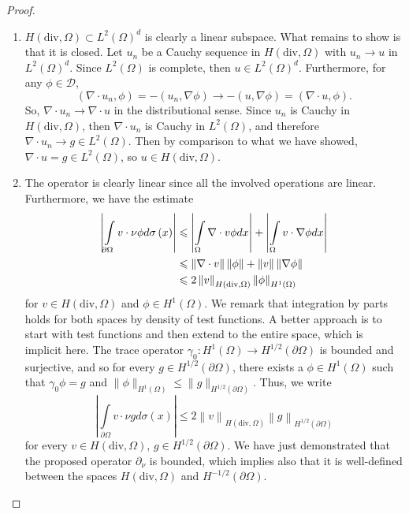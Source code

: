 \documentclass[letterpaper,twoside,11pt]{article}
\theoremstyle{mystyle}
\newcommand{\cblu}{\color{blue}}
\newcommand{\Hone}{H^1\left( \Omega \right)}
\newcommand{\Hdiv}{H\left( \text{div}, \Omega \right)}
\newcommand{\Ltwo}{L^2 \left( \Omega \right)}
\begin{document}
\cblu
\begin{proof}
  \begin{enumerate}
    \item $\Hdiv \subset \Ltwo^d$ is clearly a linear subspace. What remains to show is that it is closed. Let $u_n$ be a Cauchy sequence in $\Hdiv$ with $u_n \to u$ in $\Ltwo^d$. 
    Since $\Ltwo$ is complete, then $u \in \Ltwo^d$. Furthermore, for any \(\phi \in \mathcal D\),
    \[\left( \nabla \cdot u_n, \phi \right) = - \left( u_n, \nabla \phi \right) \to -\left( u, \nabla \phi  \right) = \left( \nabla \cdot u, \phi \right).\]
    So, $\nabla \cdot u_n \to \nabla \cdot u$ in the distributional sense. Since $u_n$ is Cauchy in $\Hdiv$, then $\nabla \cdot u_n$ is Cauchy in $\Ltwo$, and therefore $\nabla \cdot u_n \to g \in \Ltwo$. Then by comparison to what we have showed, $\nabla \cdot u = g \in \Ltwo$, so $u \in \Hdiv$. 
    \item The operator is clearly linear since all the involved operations are linear. Furthermore, we have the estimate 
    \begin{align*}
        \left| {\int\limits_{\partial \Omega } {v \cdot \nu \phi d\sigma \left( x \right)} } \right| &\leqslant \left| {\int\limits_\Omega  {\nabla  \cdot v\phi dx} } \right| + \left| {\int\limits_\Omega  {v \cdot \nabla \phi dx} } \right| \hfill \\
         &\leqslant \left\| {\nabla  \cdot v} \right\|\left\| \phi  \right\| + \left\| v \right\|\left\| {\nabla \phi } \right\| \hfill \\
         &\leqslant 2\left\| v \right\|_{\Hdiv}\left\| \phi  \right\|_{\Hone}
    \end{align*}
    for $v\in \Hdiv$ and $\phi\in \Hone$. 
    We remark that integration by parts holds for both spaces by density of test functions. A better approach is to start with test functions and then extend to the entire space, which is implicit here. 
    The trace operator $\gamma_0 : \Hone \to H^{1/2}\left( \partial \Omega \right)$ is bounded and surjective, and so for every $g \in H^{1/2}(\partial \Omega)$, there exists a $\phi \in \Hone$ such that $\gamma_0\phi = g$ and $\|\phi\|_{\Hone} \leq \|g\|_{H^{1/2}(\partial \Omega)}$. Thus, we write 
    \[\left| {\int\limits_{\partial \Omega } {v \cdot \nu gd\sigma \left( x \right)} } \right| \leqslant 2\left\| v \right\|_{\Hdiv}\left\| g \right\|_{H^{1/2}(\partial \Omega)}\]
    for every $v \in \Hdiv$, $g \in H^{1/2}(\partial\Omega)$. We have just demonstrated that the proposed operator $\partial_\nu$ is bounded, which implies also that it is well-defined between the spaces $\Hdiv$ and $H^{-1/2}(\partial\Omega)$. 

\end{enumerate}
\end{proof}
\end{document}
